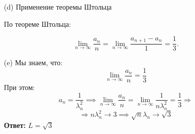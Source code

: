 \documentclass[a4paper]{article}
\renewcommand{\f}[2]{\frac{#1}{#2}}
\renewcommand{\r}{\Rightarrow}
\begin{document}
\begin{enumerate}
\begin{enumerate}
        \item[(d)]Применение теоремы Штольца

        По теореме Штольца:
        
        $$
        \lim_{n \to \infty} \frac{a_n}{n} = \lim_{n \to \infty} \frac{a_{n+1} - a_n}{1} = \frac{1}{3}.
        $$
        
        \item[(e)]Мы знаем, что:
        $$ \lim_{n \to \infty}\frac{a_n}{n} = \frac{1}{3}$$
        При этом:
        $$a_n = \f{1}{\lambda^2_n} \implies \lim_{n \to \infty}\frac{a_n}{n} = \lim_{n \to \infty}\frac{1}{n\lambda^2_n} = \f{1}{3} \r$$
        $$\r n\lambda^2_n \to 3 \implies \sqrt{n}\lambda_n \to \sqrt{3}$$
        \textbf{Ответ: } $L = \sqrt{3}$


    \end{enumerate}


\end{enumerate}
\end{document}
